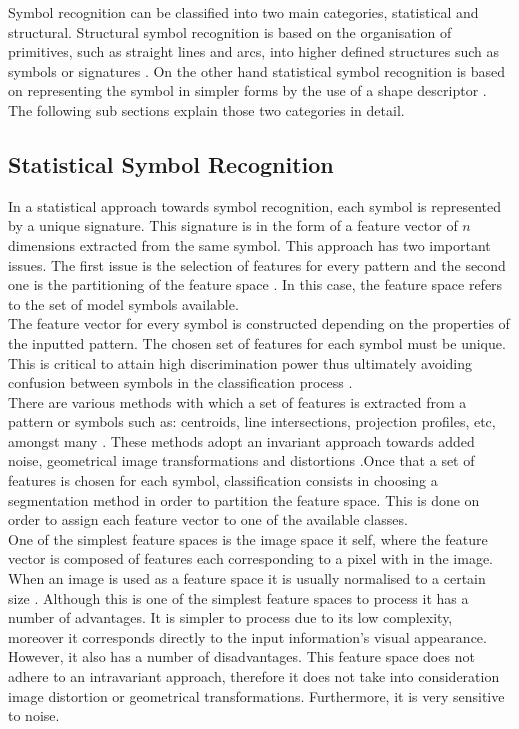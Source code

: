 Symbol recognition can be classified into two main categories, statistical and structural. Structural symbol recognition is based on the organisation of primitives, such as straight lines and arcs, into higher defined structures such as symbols or signatures \cite{ogierRobustSymbolRecognition}. On the other hand statistical symbol recognition is based on representing the symbol in simpler forms by the use of a shape descriptor \cite{Llados}. The following sub sections explain those two categories in detail.


\subsection{Statistical Symbol Recognition}
In a statistical approach towards symbol recognition, each symbol is represented by a unique signature. This signature is in the form of a feature vector of $n$ dimensions extracted from the same symbol. This approach has two important issues. The first issue is the selection of features for every pattern and the second one is the partitioning of the feature space \cite{Llados}. In this case, the feature space refers to the set of model symbols available.\\

The feature vector for every symbol is constructed depending on the properties of the inputted pattern. The chosen set of features for each symbol must be unique. This is critical to attain high discrimination power thus ultimately avoiding confusion between symbols in the classification process \cite{Llados}.\\

There are various methods with which a set of features is extracted from a pattern or symbols such as: centroids, line intersections, projection profiles, etc, amongst many \cite{Llados}. These methods adopt an invariant approach towards added noise, geometrical image transformations and distortions \cite{Llados}.Once that a set of features is chosen for each symbol, classification consists in choosing a segmentation method in order to partition the feature space. This is done on order to assign each feature vector to one of the available classes. \\

One of the simplest feature spaces is the image space it self, where the feature vector is composed of features each corresponding to a pixel with in the image. When an image is used as a feature space it is usually normalised to a certain size \cite{Llados}. Although this is one of the simplest feature spaces to process it has a number of advantages. It is simpler to process due to its low complexity, moreover it corresponds directly to the input information's visual appearance. However, it also has a number of disadvantages. This feature space does not adhere to an intravariant approach, therefore it does not take into consideration image distortion or geometrical transformations. Furthermore, it is very sensitive to noise. \\

